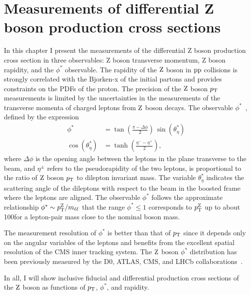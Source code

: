 \chapter{Measurements of differential Z boson production cross sections}
In this chapter I present the measurements of the differential Z boson production cross section
in three observables: Z boson transverse momentum, Z boson rapidity, and the $\phi^*$ observable.
The rapidity of the $\mathrm{Z}$ boson in $\mathrm{p}\mathrm{p}$ collisions is strongly correlated 
with the Bjorken-x of the initial partons and provides constraints on the PDFs 
of the proton.
The precision of the $\mathrm{Z}$ boson $p_{\mathrm{T}}$ measurements is limited by the uncertainties in the measurements of the transverse momenta of charged leptons from $\mathrm{Z}$ boson decays.
The observable $\phi^*$~\cite{Banfi:2010cf,Banfi:2012du,Marzani:2013nza}, defined by the expression
\begin{align}
\label{eq0}
\phi^*  &= \tan \left( \frac{\pi -\Delta\phi}{2} \right) \, \sin(\theta^*_\eta) \\
\nonumber
\cos(\theta^*_\eta)&=\tanh(\frac{\eta^- - \eta^+}{2}),
\end{align}
where $\Delta\phi$ is the opening angle between the leptons in the plane 
transverse to the beam, and $\eta^\pm$ refers to the pseudorapidity of the 
two leptons, is proportional to the ratio of $\mathrm{Z}$ boson $p_{\mathrm{T}}$ to dilepton 
invariant mass. 
The variable $\theta^*_\eta$ indicates the scattering angle of the dileptons 
with respect to the beam in the boosted frame where the leptons are aligned. 
The observable $\phi^*$ follows the approximate relationship 
$\phi^* \sim p_{\mathrm{T}}^{\mathrm{Z}} / m_{\ell\ell}$ that the range $\phi^* \le 1$ 
corresponds to $p_{\mathrm{T}}^{\mathrm{Z}}$ up to about 100\GeV for a lepton-pair mass close 
to the nominal \cPZ{} boson mass.

The measurement resolution of $\phi^*$ is better than that of $p_{\mathrm{T}}$ since it depends only on the angular variables of 
the leptons and benefits from the  excellent spatial resolution of the CMS 
inner tracking system. The $\mathrm{Z}$ boson $\phi^*$ distribution has been 
previously measured by the D0, ATLAS, CMS, and LHCb 
collaborations~\cite{TevatronWZ:D0PhysRevLett2011_106,Aad:2015auj,Sirunyan:2017igm,Aaij:2016mgv}.     

In all, I will show inclusive fiducial and differential production cross sections of 
the $\mathrm{Z}$ boson as functions of $p_{\mathrm{T}}$, $\phi^*$, and rapidity. 

